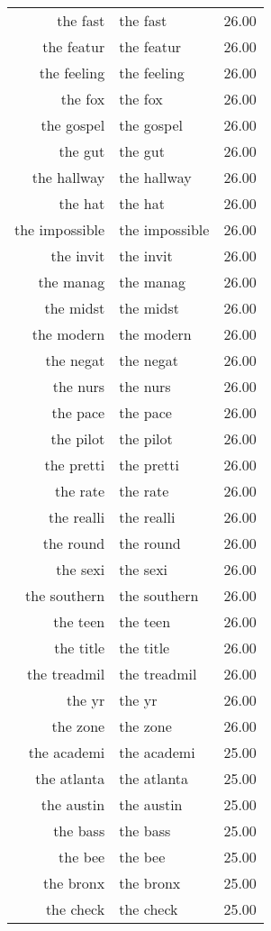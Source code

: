 \begin{table}[ht]
\begin{tabular}{rlr}
  the fast & the fast & 26.00 \\ 
  the featur & the featur & 26.00 \\ 
  the feeling & the feeling & 26.00 \\ 
  the fox & the fox & 26.00 \\ 
  the gospel & the gospel & 26.00 \\ 
  the gut & the gut & 26.00 \\ 
  the hallway & the hallway & 26.00 \\ 
  the hat & the hat & 26.00 \\ 
  the impossible & the impossible & 26.00 \\ 
  the invit & the invit & 26.00 \\ 
  the manag & the manag & 26.00 \\ 
  the midst & the midst & 26.00 \\ 
  the modern & the modern & 26.00 \\ 
  the negat & the negat & 26.00 \\ 
  the nurs & the nurs & 26.00 \\ 
  the pace & the pace & 26.00 \\ 
  the pilot & the pilot & 26.00 \\ 
  the pretti & the pretti & 26.00 \\ 
  the rate & the rate & 26.00 \\ 
  the realli & the realli & 26.00 \\ 
  the round & the round & 26.00 \\ 
  the sexi & the sexi & 26.00 \\ 
  the southern & the southern & 26.00 \\ 
  the teen & the teen & 26.00 \\ 
  the title & the title & 26.00 \\ 
  the treadmil & the treadmil & 26.00 \\ 
  the yr & the yr & 26.00 \\ 
  the zone & the zone & 26.00 \\ 
  the academi & the academi & 25.00 \\ 
  the atlanta & the atlanta & 25.00 \\ 
  the austin & the austin & 25.00 \\ 
  the bass & the bass & 25.00 \\ 
  the bee & the bee & 25.00 \\ 
  the bronx & the bronx & 25.00 \\ 
  the check & the check & 25.00 \\ 

\end{tabular}
\end{table}
